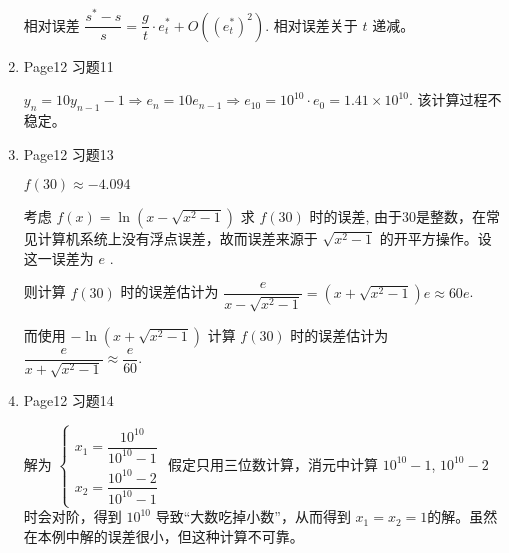 \documentclass{article}
\begin{document}
\begin{enumerate}
    相对误差 $\dfrac{s^* - s}{s} = \dfrac{g}{t}\cdot e_t^* + O((e_t^*)^2)$. 相对误差关于 $t$ 递减。

    \item Page12 习题11 
    
    $y_n = 10 y_{n-1} - 1 \Rightarrow e_n = 10 e_{n-1} \Rightarrow e_{10} = 10 ^ {10} \cdot e_{0} = 1.41\times 10 ^ {10}$. 该计算过程不稳定。

    \item Page12 习题13
    
    $f(30) \approx -4.094 $

    考虑 $f(x) = \ln(x - \sqrt{x^2 - 1})$ 求 $f(30)$ 时的误差, 由于$30$是整数，在常见计算机系统上没有浮点误差，故而误差来源于 $\sqrt{x^2-1}$ 的开平方操作。设这一误差为 $e$ .

    则计算 $f(30)$ 时的误差估计为 $\dfrac{e}{x-\sqrt{x^2-1}} = (x + \sqrt{x^2-1})e \approx 60 e$.

    而使用 $-\ln(x+\sqrt{x^2-1})$ 计算 $f(30)$ 时的误差估计为 $\dfrac{e}{x+\sqrt{x^2-1}} \approx \dfrac{e}{60}$.


    \item Page12 习题14
    
    解为 $\left\{\begin{array}{l} x_1 = \dfrac{10^{10}}{10^{10} - 1} \\ x_2 = \dfrac{10^{10} - 2}{10^{10} - 1} \end{array}\right.$
    假定只用三位数计算，消元中计算 $10^{10}-1$, $10^{10}-2$ 时会对阶，得到 $10^{10}$ 导致``大数吃掉小数''，从而得到
    $x_1=x_2=1$的解。虽然在本例中解的误差很小，但这种计算不可靠。

\end{enumerate}
\end{document}
